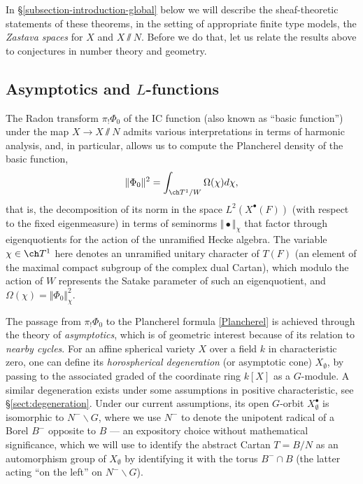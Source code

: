 \documentclass[final]{amsart}
\theoremstyle{remark}
\theoremstyle{definition}
\numberwithin{equation}{section}
\begin{document}
\medskip

In \S \ref{subsection-introduction-global} below we will describe the sheaf-theoretic statements of these theorems, in the setting of appropriate finite type models, the \emph{Zastava spaces} for $X$ and $X\sslash N$. Before we do that, let us relate the results above to conjectures in number theory and geometry.


\subsection{Asymptotics and $L$-functions}

The Radon transform $\pi_! \Phi_0$ of the IC function (also known as ``basic function'') under the map $X\to X\sslash N$ admits various interpretations in terms of harmonic analysis, and, in particular,  allows us to compute the Plancherel density of the basic function,
\begin{equation}\label{Plancherel} \Vert \Phi_0 \Vert^2 = \int_{\ch T^1/W} \Omega(\chi) d\chi,
\end{equation}
that is, the decomposition of its norm in the space $L^2(X^\bullet(F))$ (with respect to the fixed eigenmeasure) in terms of seminorms $\Vert \bullet \Vert_\chi$ that factor through eigenquotients for the action of the unramified Hecke algebra. The variable $\chi\in \ch T^1$ here denotes an unramified unitary character of $T(F)$ (an element of the maximal compact subgroup of the complex dual Cartan), which modulo the action of $W$ represents the Satake parameter of such an eigenquotient, and $\Omega(\chi) = \Vert \Phi_0\Vert^2_\chi$. 

The passage from $\pi_! \Phi_0$ to the Plancherel formula \eqref{Plancherel} is achieved through the theory of \emph{asymptotics}, which is of geometric interest because of its relation to \emph{nearby cycles}. For an affine spherical variety $X$ over a field $k$ in characteristic zero, one can define its \emph{horospherical degeneration} (or asymptotic cone) $X_\emptyset$, by passing to the associated graded of the coordinate ring $k[X]$ as a $G$-module. A similar degeneration exists under some assumptions in positive characteristic, see \S\ref{sect:degeneration}. Under our current assumptions, its open $G$-orbit $X_\emptyset^\bullet$ is isomorphic to $N^-\backslash G$, where we use $N^-$ to denote the unipotent radical of a Borel $B^-$ opposite to $B$ --- an expository choice 
without mathematical significance, which we will use to identify the abstract Cartan $T=B/N$ as an automorphism group of $X_\emptyset$ by identifying it with the torus $B^-\cap B$ (the latter acting ``on the left'' on $N^-\backslash G$). 
\end{document}
